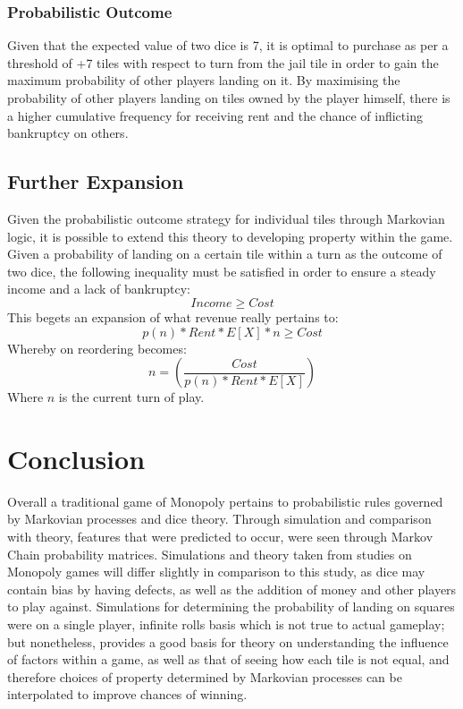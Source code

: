 \documentclass[12pt]{article}
\begin{document}
\subsubsection{Probabilistic Outcome}
Given that the expected value of two dice is 7, it is optimal to purchase as per a threshold of +7 tiles with respect to turn from the jail tile in order to gain the maximum probability of other players landing on it. By maximising the probability of other players landing on tiles owned by the player himself, there is a higher cumulative frequency for receiving rent and the chance of inflicting bankruptcy on others.

\subsection{Further Expansion}
Given the probabilistic outcome strategy for individual tiles through Markovian logic, it is possible to extend this theory to developing property within the game. Given a probability of landing on a certain tile within a turn as the outcome of two dice, the following inequality must be satisfied in order to ensure a steady income and a lack of bankruptcy:
$$Income \geq Cost$$
This begets an expansion of what revenue really pertains to:
$$p(n)*Rent*E[X]*n \geq Cost$$
Whereby on reordering becomes:
$$n = \left(\frac{Cost}{p(n)*Rent*E[X]}\right)$$
Where $n$ is the current turn of play.
\section{Conclusion}
Overall a traditional game of Monopoly pertains to probabilistic rules governed by Markovian processes and dice theory. Through simulation and comparison with theory, features that were predicted to occur, were seen through Markov Chain probability matrices. Simulations and theory taken from studies on Monopoly games will differ slightly in comparison to this study, as dice may contain bias by having defects, as well as the addition of money and other players to play against. Simulations for determining the probability of landing on squares were on a single player, infinite rolls basis which is not true to actual gameplay; but nonetheless, provides a good basis for theory on understanding the influence of factors within a game, as well as that of seeing how each tile is not equal, and therefore choices of property determined by Markovian processes can be interpolated to improve chances of winning.
\end{document}
